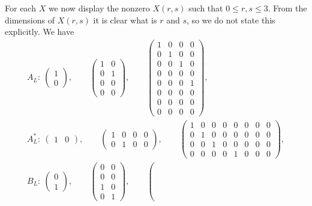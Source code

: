 \documentclass[pdftex]{sigma}
\numberwithin{equation}{section}
\begin{document}
For each $X$ we now display the nonzero $X(r,s)$ such that $0 \leq r,s\leq 3$. From the dimensions of $X(r,s)$ it is clear what is $r$ and $s$, so we do not state this explicitly. We have
\begin{gather*}
A_L\colon \
 \left(
 \begin{matrix}
 1 \\
 0
 \end{matrix}
 \right),
\qquad
 \left(
 \begin{matrix}
 1 & 0 \\
 0 & 1 \\
 0 & 0 \\
 0 & 0
 \end{matrix}
 \right),
\qquad
 \left(
 \begin{matrix}
 1 & 0 & 0 & 0 \\
 0 & 1 & 0 & 0 \\
 0 & 0 & 1 & 0 \\
 0 & 0 & 0 & 0 \\
 0 & 0 & 0 & 1 \\
 0 & 0 & 0 & 0 \\
 0 & 0 & 0 & 0 \\
 0 & 0 & 0 & 0
 \end{matrix}
 \right),
\\
A^*_L\colon \
 \left(
 \begin{matrix}
 1 & 0
 \end{matrix}
 \right),
 \qquad
	\left(
 \begin{matrix}
 1 & 0 & 0 & 0 \\
 0 & 1 & 0 & 0
 \end{matrix}
 \right),
\qquad
 \left(
 \begin{matrix}
 1 & 0 & 0 & 0 & 0 &0 &0 &0 \\
 0 & 1 & 0 & 0 & 0 & 0 &0 & 0 \\
 0 & 0 & 1 & 0 & 0 &0 & 0 & 0 \\
 0 & 0 & 0 & 0 & 1 & 0 &0 &0
 \end{matrix}
 \right),
\\
B_L\colon \
 \left(
 \begin{matrix}
 0 \\
 1
 \end{matrix}
 \right),
 \qquad
 \left(
 \begin{matrix}
 0 & 0 \\
 0 & 0 \\
 1 & 0 \\
 0 & 1
 \end{matrix}
 \right),
\qquad
 \left(

\end{gather*}
\end{document}
